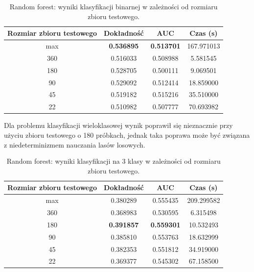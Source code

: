 \documentclass[a4paper, twoside, 11pt, openright]{article}
\begin{document}
\begin{table}[H]
    \centering
    \begin{tabular}{|c|c|c|c|}
    \hline
        \textbf{Rozmiar zbioru testowego} & \textbf{Dokładność} & \textbf{AUC} & \textbf{Czas (s)} \\ \hline
max                         & \textbf{0.536895} &  \textbf{0.513701} &  167.971013 \\ \hline
360                         &  0.516033 &  0.508988 &    5.581545 \\ \hline
180                         &  0.528705 &  0.500111 &    9.069501 \\ \hline
90                          &  0.529092 &  0.512414 &   18.859000 \\ \hline
45                          &  0.519182 &  0.515216 &   35.510000 \\ \hline
22                          &  0.510982 &  0.507777 &   70.693982 \\ \hline

    \end{tabular}
    \caption{Random forest: wyniki klasyfikacji binarnej w zależności od rozmiaru zbioru testowego.}
    \label{tab:rf_walk_forward_binary}
\end{table}

Dla problemu klasyfikacji wieloklasowej wynik poprawił się nieznacznie przy użyciu zbioru testowego o 180 próbkach, jednak taka poprawa może być związana z niedeterminizmem nauczania lasów losowych.

\begin{table}[H]
    \centering
    \begin{tabular}{|c|c|c|c|}
    \hline
        \textbf{Rozmiar zbioru testowego} & \textbf{Dokładność} & \textbf{AUC} & \textbf{Czas (s)} \\ \hline
max                         &   0.380289 &  0.555435 &  209.299582 \\ \hline
360                         &  0.368983 &  0.530595 &    6.315498 \\ \hline
180                         &  \textbf{0.391857} &  \textbf{0.559301} &   10.532493 \\ \hline
90                          &  0.385810 &  0.553763 &   18.632999 \\ \hline
45                          &  0.382353 &  0.551812 &   34.919000 \\ \hline
22                          &  0.369377 &  0.545302 &   67.158500 \\ \hline
    \end{tabular}
    \caption{Random forest: wyniki klasyfikacji na 3 klasy w zależności od rozmiaru zbioru testowego.}
    \label{tab:rf_walk_forward_discrete}
\end{table}
\end{document}
